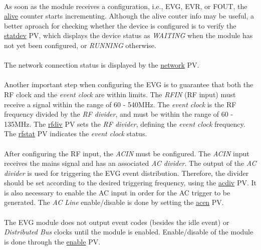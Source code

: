 \documentclass[openany]{article}
\begin{document}
			\paragraph{} As soon as the module receives a configuration, i.e., EVG, EVR, or FOUT, the \hyperref[pvgroup:evg-configuration]{alive} counter starts incrementing. Although the alive couter info may be useful, a better aproach for checking whether the device is configured is to verify the \hyperref[pvgroup:evg-module-support]{statdev} PV, which displays the device status as \emph{WAITING} when the module has not yet been configured, or \emph{RUNNING} otherwise.
			\paragraph{} The network connection status is displayed by the \hyperref[pvgroup:evg-module-support]{network} PV.
			\paragraph{} Another important step when configuring the EVG is to guarantee that both the RF clock and the \emph{event clock} are within limits. The \emph{RFIN} (RF input) must receive a signal within the range of 60 - 540MHz. The \emph{event clock} is the RF frequency divided by the \emph{RF divider}, and must be within the range of 60 - 135MHz. The \hyperref[pvgroup:evg-configuration]{rfdiv} PV sets the \emph{RF divider}, defining the \emph{event clock} frequency. The \hyperref[pvgroup:evg-control-status]{rfstat} PV indicates the \emph{event clock} status.
			\paragraph{} After configuring the RF input, the \emph{ACIN} must be configured. The \emph{ACIN} input receives the mains signal and has an associated \emph{AC divider}. The output of the \emph{AC divider} is used for triggering the EVG event distribution. Therefore, the divider should be set according to the desired triggering frequency, using the \hyperref[pvgroup:evg-acline]{acdiv} PV. It is also necessary to enable the AC input in order for the AC trigger to be generated. The \emph{AC Line} enable/disable is done by setting the \hyperref[pvgroup:evg-acline]{acen} PV.
			\paragraph{} The EVG module does not output event codes (besides the idle event) or \emph{Distributed Bus} clocks until the module is enabled. Enable/disable of the module is done through the \hyperref[pvgroup:evg-control-status]{enable} PV.
\end{document}
